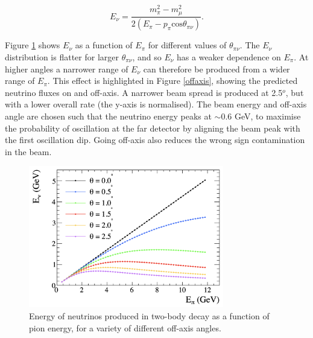 \begin{equation}
E_{\nu} = \frac{m^{2}_{\pi} - m^{2}_{\mu}}{2(E_{\pi} - p_{\pi} \text{cos}\theta_{\pi\nu})}.
\end{equation}

Figure \ref{offaxisEdep} shows $E_\nu$ as a function of $E_\pi$ for different values of $\theta_{\pi\nu}$. The $E_\nu$ distribution is flatter for larger $\theta_{\pi\nu}$, and so $E_\nu$ has a weaker dependence on $E_\pi$. At higher angles a narrower range of $E_\nu$ can therefore be produced from a wider range of $E_\pi$. This effect is highlighted in Figure \ref{offaxis}, showing the predicted neutrino fluxes on and off-axis. A narrower beam spread is produced at 2.5$^o$, but with a lower overall rate (the y-axis is normalised). The beam energy and off-axis angle are chosen such that the neutrino energy peaks at $\sim$0.6 GeV, to maximise the probability of oscillation at the far detector by aligning the beam peak with the first oscillation dip. Going off-axis also reduces the wrong sign contamination in the beam. 

\begin{figure}[!htbp]
\centering
\includegraphics*[width=0.76\textwidth,clip]{figs/offAxisEnergyDep}
\caption{Energy of neutrinos produced in two-body decay as a function of pion energy, for a variety of different off-axis angles.} \label{offaxisEdep}
\end{figure}

